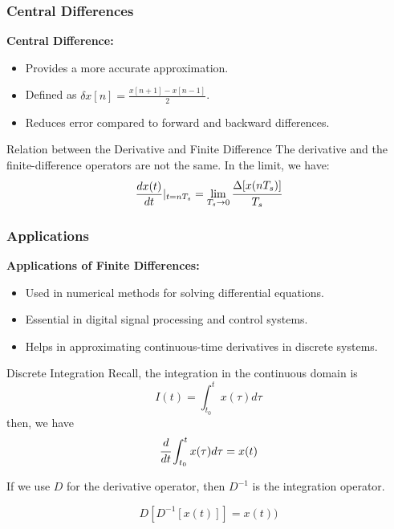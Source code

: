 \documentclass[aspectratio=169,xcolor=dvipsnames,svgnames,x11names,fleqn]{beamer}
\begin{document}
\begin{frame}
\frametitle{Central Differences}
\textbf{Central Difference:}
\begin{itemize}
    \item Provides a more accurate approximation.
    \item Defined as \( \delta x[n] = \frac{x[n+1] - x[n-1]}{2} \).
    \item Reduces error compared to forward and backward differences.
\end{itemize}
\end{frame}


\begin{frame}{Relation between the Derivative and Finite Difference}
    The derivative and the finite-difference operators are not the same. In the limit, we have:
    \begin{equation*}
            \frac{dx(t)}{dt}|_{t = nT_s} = \lim_{T_s\to 0 }\cfrac{\Delta [x (nT_s)]}{T_s}
    \end{equation*}

\end{frame}

\begin{frame}
\frametitle{Applications}
\textbf{Applications of Finite Differences:}
\begin{itemize}
    \item Used in numerical methods for solving differential equations.
    \item Essential in digital signal processing and control systems.
    \item Helps in approximating continuous-time derivatives in discrete systems.
\end{itemize}
\end{frame}

\begin{frame}{Discrete Integration}
Recall, the integration in the continuous domain is 
$$
I(t) = \int_{t_0}^t x(\tau) d\tau
$$
then, we have 
$$
\cfrac{d}{dt} \int_{t_0}^t x(\tau) d\tau = x(t)
$$

If we use $D$ for the derivative operator, then $D^{-1}$ is the integration operator.

$$
D[ D^{-1}[x(t)]] = x(t))
$$
\end{frame}
\end{document}
